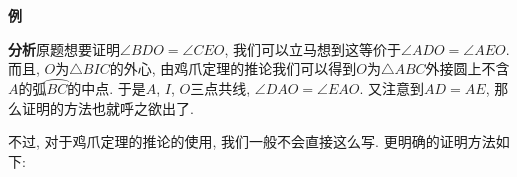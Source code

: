 \documentclass{book}
\begin{document}
\begin{paracol}{2}
\switchcolumn
\begin{tcolorbox}
	\textbf{例}
\end{tcolorbox}\par
\textbf{分析}\quad 原题想要证明$\angle BDO=\angle CEO$, 我们可以立马想到这等价于$\angle ADO=\angle AEO$. 而且, $O$为$\triangle BIC$的外心, 由鸡爪定理的推论我们可以得到$O$为$\triangle ABC$外接圆上不含$A$的弧$\wideparen{BC}$的中点. 于是$A$, $I$, $O$三点共线, $\angle DAO=\angle EAO$. 又注意到$AD=AE$, 那么证明的方法也就呼之欲出了.\par
不过, 对于鸡爪定理的推论的使用, 我们一般不会直接这么写. 更明确的证明方法如下:\par


\end{paracol}
\end{document}
